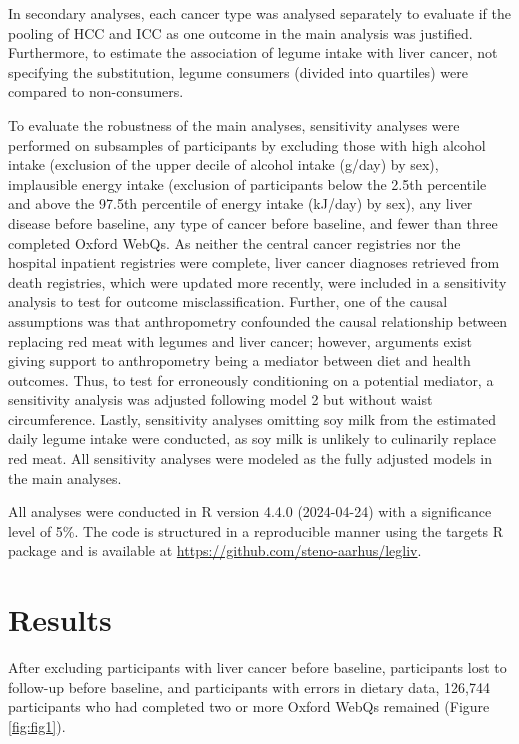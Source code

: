 \documentclass[nutrients,article,submit,moreauthors,pdftex]{Definitions/mdpi}
\begin{document}
In secondary analyses, each cancer type was analysed separately to
evaluate if the pooling of HCC and ICC as one outcome in the main
analysis was justified. Furthermore, to estimate the association of
legume intake with liver cancer, not specifying the substitution, legume
consumers (divided into quartiles) were compared to non-consumers.

To evaluate the robustness of the main analyses, sensitivity analyses
were performed on subsamples of participants by excluding those with
high alcohol intake (exclusion of the upper decile of alcohol intake
(g/day) by sex), implausible energy intake (exclusion of participants
below the 2.5th percentile and above the 97.5th percentile of energy
intake (kJ/day) by sex), any liver disease before baseline, any type of
cancer before baseline, and fewer than three completed Oxford WebQs. As
neither the central cancer registries nor the hospital inpatient
registries were complete, liver cancer diagnoses retrieved from death
registries, which were updated more recently, were included in a
sensitivity analysis to test for outcome misclassification. Further, one
of the causal assumptions was that anthropometry confounded the causal
relationship between replacing red meat with legumes and liver cancer;
however, arguments exist giving support to anthropometry being a
mediator between diet and health outcomes. Thus, to test for erroneously
conditioning on a potential mediator, a sensitivity analysis was
adjusted following model 2 but without waist circumference. Lastly,
sensitivity analyses omitting soy milk from the estimated daily legume
intake were conducted, as soy milk is unlikely to culinarily replace red
meat. All sensitivity analyses were modeled as the fully adjusted models
in the main analyses.

All analyses were conducted in R version 4.4.0 (2024-04-24) with a
significance level of 5\%. The code is structured in a reproducible
manner using the targets R package \citep{landau2021} and is available at
\url{https://github.com/steno-aarhus/legliv}.

\hypertarget{sec3}{%
\section{Results}\label{sec3}}

After excluding participants with liver cancer before baseline,
participants lost to follow-up before baseline, and participants with
errors in dietary data, 126,744 participants who had completed two or
more Oxford WebQs remained (Figure \ref{fig:fig1}).
\end{document}
